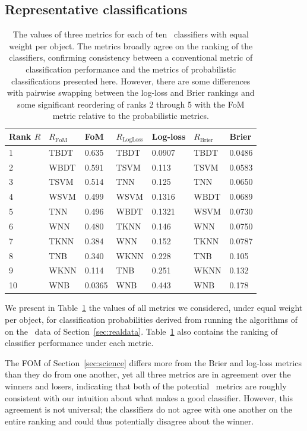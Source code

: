 \subsection{Representative classifications}
\label{sec:realresults}

\begin{table}[]
	\begin{centering}
\begin{tabular}{lllllll}%
Rank $R$ & $R_\mathrm{FoM}$ & FoM & %
$R_\mathrm{LogLoss}$ & Log-loss & $R_\mathrm{Brier}$ & Brier \\
\hline
1  & TBDT & 0.635  %
& TBDT & 0.0907 & TBDT & 0.0486 \\
2  & WBDT & 0.591  %
& TSVM & 0.113  & TSVM & 0.0583 \\
3  & TSVM & 0.514  %
& TNN  & 0.125  & TNN  & 0.0650 \\
4  & WSVM & 0.499  %
& WSVM & 0.1316 & WBDT & 0.0689 \\
5  & TNN  & 0.496  %
& WBDT & 0.1321 & WSVM & 0.0730 \\
6  & WNN  & 0.480  %
& TKNN & 0.146  & WNN  & 0.0750 \\
7  & TKNN & 0.384  %
& WNN  & 0.152  & TKNN & 0.0787 \\
8  & TNB  & 0.340  %
& WKNN & 0.228  & TNB  & 0.105  \\
9  & WKNN & 0.114  %
& TNB  & 0.251  & WKNN & 0.132  \\
10 & WNB  & 0.0365 %
& WNB  & 0.443  & WNB  & 0.178  \\
\end{tabular}
	\caption{The values of three metrics for each of ten \snmachine\ classifiers with equal weight per object.
	The metrics broadly agree on the ranking of the classifiers, confirming consistency between a conventional metric of classification performance and the metrics of probabilistic classifications presented here.
	However, there are some differences with pairwise swapping between the log-loss and Brier rankings and some significant reordering of ranks 2 through 5 with the FoM metric relative to the probabilistic metrics.}
	\label{tab:snmachineresults}
	\end{centering}
\end{table}

We present in Table~\ref{tab:snmachineresults} the values of all metrics we considered, under equal weight per object, for classification probabilities derived from running the algorithms of \citet{lochner_photometric_2016} on the \snphotcc\ data of Section~\ref{sec:realdata}.
Table~\ref{tab:snmachineresults} also contains the ranking of classifier performance under each metric.

The FOM of Section~\ref{sec:science} differs more from the Brier and log-loss metrics than they do from one another, yet all three metrics are in agreement over the winners and losers, indicating that both of the potential \plasticc\ metrics are roughly consistent with our intuition about what makes a good classifier.
However, this agreement is not universal; the classifiers do not agree with one another on the entire ranking and could thus potentially disagree about the winner.
